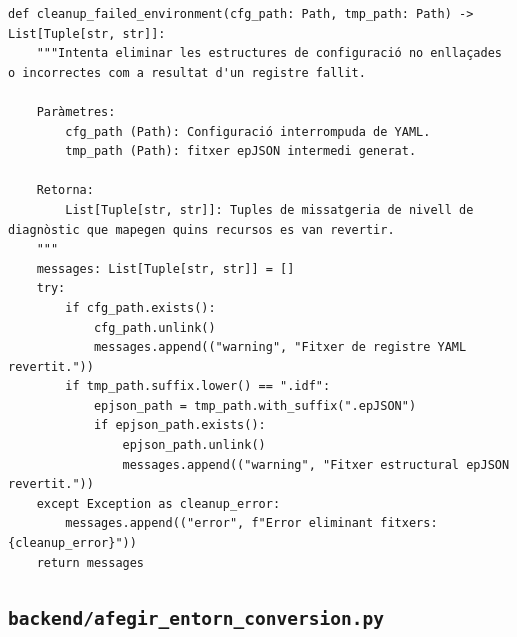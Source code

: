 \documentclass[10pt,a4paper]{article}
\begin{document}
\begin{lstlisting}[style=studioPython,caption={backend/afegir\_entorn\_config.py},label={lst:backend-afegir-entorn-config-py}]
def cleanup_failed_environment(cfg_path: Path, tmp_path: Path) -> List[Tuple[str, str]]:
    """Intenta eliminar les estructures de configuració no enllaçades o incorrectes com a resultat d'un registre fallit.

    Paràmetres:
        cfg_path (Path): Configuració interrompuda de YAML.
        tmp_path (Path): fitxer epJSON intermedi generat.

    Retorna:
        List[Tuple[str, str]]: Tuples de missatgeria de nivell de diagnòstic que mapegen quins recursos es van revertir.
    """
    messages: List[Tuple[str, str]] = []
    try:
        if cfg_path.exists():
            cfg_path.unlink()
            messages.append(("warning", "Fitxer de registre YAML revertit."))
        if tmp_path.suffix.lower() == ".idf":
            epjson_path = tmp_path.with_suffix(".epJSON")
            if epjson_path.exists():
                epjson_path.unlink()
                messages.append(("warning", "Fitxer estructural epJSON revertit."))
    except Exception as cleanup_error:
        messages.append(("error", f"Error eliminant fitxers: {cleanup_error}"))
    return messages
\end{lstlisting}


\subsection{\texorpdfstring{\texttt{backend/afegir\_entorn\_conversion.py}}{backend/afegir\_entorn\_conversion.py}}
\end{document}
